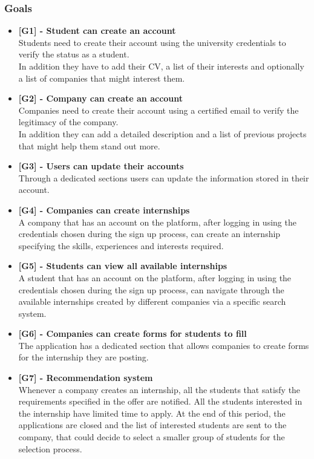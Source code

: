 \documentclass[11pt,twoside]{article}
\begin{document}
\subsubsection{Goals}
\begin{itemize}
\item \textbf{[G1] - Student can create an account} \\
Students need to create their account using the university credentials to verify the status as a student. \\
In addition they have to add their CV, a list of their interests and optionally a list of companies that might interest them.
\item \textbf{[G2] - Company can create an account} \\
Companies need to create their account using a certified email to verify the legitimacy of the company. \\
In addition they can add a detailed description and a list of previous projects that might help them stand out more.
\item \textbf{[G3] - Users can update their accounts} \\
Through a dedicated sections users can update the information stored in their account.
\item \textbf{[G4] - Companies can create internships} \\
A company that has an account on the platform, after logging in using the credentials chosen during the sign up process, can create an internship specifying the skills, experiences and interests required.
\item \textbf{[G5] - Students can view all available internships} \\
A student that has an account on the platform, after logging in using the credentials chosen during the sign up process, can navigate through the available internships created by different companies via a specific search system.
\item \textbf{[G6] - Companies can create forms for students to fill} \\
The application has a dedicated section that allows companies to create forms for the internship they are posting.
\item \textbf{[G7] - Recommendation system} \\
Whenever a company creates an internship, all the students that satisfy the requirements specified in the offer are notified. All the students interested in the internship have limited time to apply. At the end of this period, the applications are closed and the list of interested students are sent to the company, that could decide to select a smaller group of students for the selection process.

\end{itemize}
\end{document}
